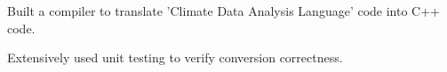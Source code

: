 \documentclass[]{rinkal_resume}
\begin{document}
\begin{minipage}[t]{0.69\textwidth}

\begin{tightemize}
\item  Built a compiler to translate 'Climate Data Analysis Language' code into C++ code.
\item Extensively used unit testing to verify conversion correctness.
\end{tightemize}
\smallsectionsep

\end{minipage} 
\end{document}
